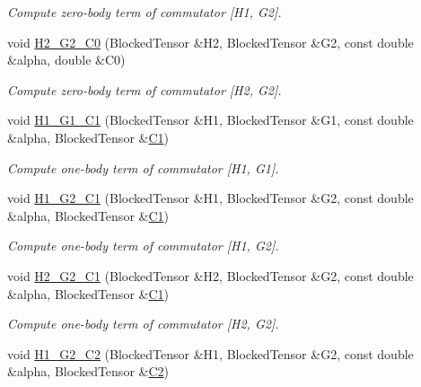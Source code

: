 \begin{DoxyCompactItemize}
\begin{DoxyCompactList}\small\item\em Compute zero-\/body term of commutator \mbox{[}H1, G2\mbox{]}. \end{DoxyCompactList}\item 
void \mbox{\hyperlink{classforte_1_1_m_a_s_t_e_r___d_s_r_g_af0e6fb8d2ac9e0975b43b9d852fe9b4d}{H2\+\_\+\+G2\+\_\+\+C0}} (Blocked\+Tensor \&H2, Blocked\+Tensor \&G2, const double \&alpha, double \&C0)
\begin{DoxyCompactList}\small\item\em Compute zero-\/body term of commutator \mbox{[}H2, G2\mbox{]}. \end{DoxyCompactList}\item 
void \mbox{\hyperlink{classforte_1_1_m_a_s_t_e_r___d_s_r_g_ac7f2504a87fc3acdca92b6b5893db3d0}{H1\+\_\+\+G1\+\_\+\+C1}} (Blocked\+Tensor \&H1, Blocked\+Tensor \&G1, const double \&alpha, Blocked\+Tensor \&\mbox{\hyperlink{namespaceforte_abe00ec86d0015c0f2b6ac298c6e428e4a1a2ddc2db4693cfd16d534cde5572cc1}{C1}})
\begin{DoxyCompactList}\small\item\em Compute one-\/body term of commutator \mbox{[}H1, G1\mbox{]}. \end{DoxyCompactList}\item 
void \mbox{\hyperlink{classforte_1_1_m_a_s_t_e_r___d_s_r_g_a696380d2453e2d7a5319f9ba82acf89e}{H1\+\_\+\+G2\+\_\+\+C1}} (Blocked\+Tensor \&H1, Blocked\+Tensor \&G2, const double \&alpha, Blocked\+Tensor \&\mbox{\hyperlink{namespaceforte_abe00ec86d0015c0f2b6ac298c6e428e4a1a2ddc2db4693cfd16d534cde5572cc1}{C1}})
\begin{DoxyCompactList}\small\item\em Compute one-\/body term of commutator \mbox{[}H1, G2\mbox{]}. \end{DoxyCompactList}\item 
void \mbox{\hyperlink{classforte_1_1_m_a_s_t_e_r___d_s_r_g_af2a98ef2b5d852422e3392909c4d6f2a}{H2\+\_\+\+G2\+\_\+\+C1}} (Blocked\+Tensor \&H2, Blocked\+Tensor \&G2, const double \&alpha, Blocked\+Tensor \&\mbox{\hyperlink{namespaceforte_abe00ec86d0015c0f2b6ac298c6e428e4a1a2ddc2db4693cfd16d534cde5572cc1}{C1}})
\begin{DoxyCompactList}\small\item\em Compute one-\/body term of commutator \mbox{[}H2, G2\mbox{]}. \end{DoxyCompactList}\item 
void \mbox{\hyperlink{classforte_1_1_m_a_s_t_e_r___d_s_r_g_aa73d1b9938d01f9cb621d70c1c7c8828}{H1\+\_\+\+G2\+\_\+\+C2}} (Blocked\+Tensor \&H1, Blocked\+Tensor \&G2, const double \&alpha, Blocked\+Tensor \&\mbox{\hyperlink{namespaceforte_abe00ec86d0015c0f2b6ac298c6e428e4af1a543f5a2c5d49bc5dde298fcf716e4}{C2}})

\end{DoxyCompactItemize}
